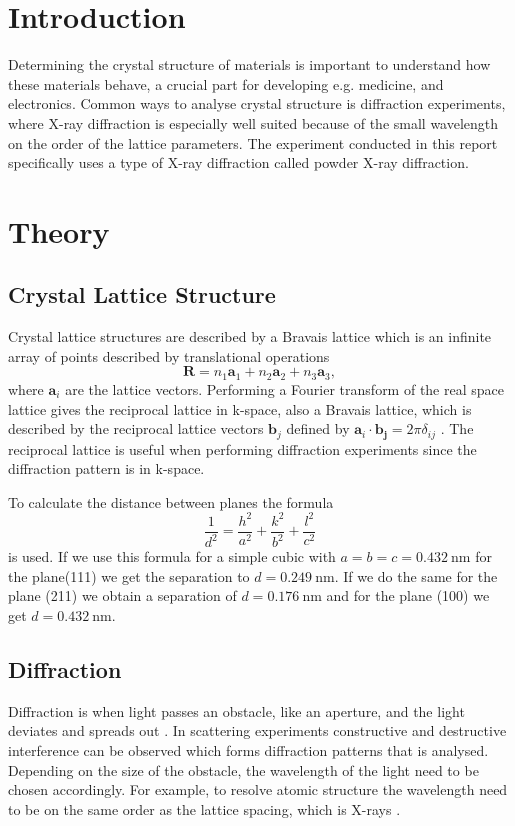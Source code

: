 \section{Introduction}
Determining the crystal structure of materials is important to understand how these materials behave, a crucial part for developing e.g. medicine, and electronics. Common ways to analyse crystal structure is diffraction experiments, where X-ray diffraction is especially well suited because of the small wavelength on the order of the lattice parameters. The experiment conducted in this report specifically uses a type of X-ray diffraction called powder X-ray diffraction.

\section{Theory}
\subsection{Crystal Lattice Structure}
Crystal lattice structures are described by a Bravais lattice \cite{hofmann2015} which is an infinite array of points described by translational operations
\begin{equation}
    \mathbf{R} = n_1\mathbf{a}_1 + n_2\mathbf{a}_2 + n_3\mathbf{a}_3,
\end{equation}
where $\mathbf{a}_i$ are the lattice vectors. Performing a Fourier transform of the real space lattice gives the reciprocal lattice in k-space, also a Bravais lattice, which is described by the reciprocal lattice vectors $\mathbf{b}_j$ defined by $\mathbf{a}_i \cdot \mathbf{b_j} = 2\pi \delta_{ij}$ \cite{hofmann2015}. The reciprocal lattice is useful when performing diffraction experiments since the diffraction pattern is in k-space. 

To calculate the distance between planes the formula 
\begin{equation}
\frac{1}{d^2}=\frac{h^2}{a^2}+\frac{k^2}{b^2}+\frac{l^2}{c^2}
\label{eq:seperation}
\end{equation}
is used.
If we use this formula for a simple cubic with $a=b=c=\SI{0.432}{\nano\m}$ for the plane(111) we get the separation to $d=\SI{0.249}{\nano\m}$. If we do the same for the plane (211) we obtain a separation of $d=\SI{0.176}{\nano\m}$ and for the plane (100) we get $d=\SI{0.432}{\nano\m}$. 

\subsection{Diffraction}
Diffraction is when light passes an obstacle, like an aperture, and the light deviates and spreads out \cite{hofmann2015}. In scattering experiments constructive and destructive interference can be observed which forms diffraction patterns that is analysed. Depending on the size of the obstacle, the wavelength of the light need to be chosen accordingly. For example, to resolve atomic structure the wavelength need to be on the same order as the lattice spacing, which is X-rays \cite{hofmann2015}.

